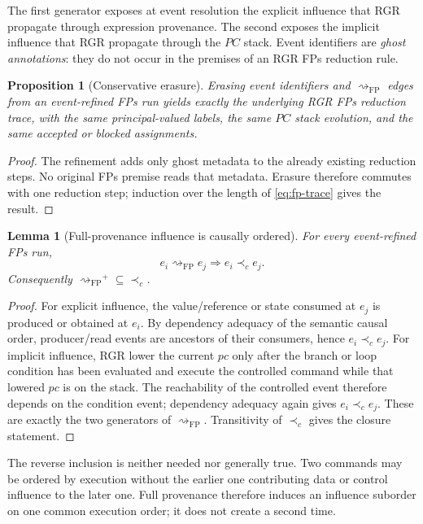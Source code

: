 \documentclass[10pt,twocolumn]{article}
\newcommand{\FP}{\mathrm{FP}}
\newcommand{\Influence}{\mathrel{\rightsquigarrow_{\!\FP}}}
\newcommand{\hb}{\prec_{c}}
\newtheorem{proposition}{Proposition}
\newtheorem{lemma}{Lemma}
\begin{document}
The first generator exposes at event resolution the explicit influence that
RGR propagate through expression provenance. The second exposes the implicit
influence that RGR propagate through the $PC$ stack. Event identifiers are
\emph{ghost annotations}: they do not occur in the premises of an RGR FPs
reduction rule.

\begin{proposition}[Conservative erasure]
Erasing event identifiers and $\Influence$ edges from an event-refined FPs run
yields exactly the underlying RGR FPs reduction trace, with the same
principal-valued labels, the same $PC$ stack evolution, and the same accepted
or blocked assignments.
\end{proposition}

\begin{proof}
The refinement adds only ghost metadata to the already existing reduction
steps. No original FPs premise reads that metadata. Erasure therefore commutes
with one reduction step; induction over the length of \eqref{eq:fp-trace} gives
the result.
\end{proof}

\begin{lemma}[Full-provenance influence is causally ordered]
\label{lem:fp-causal}
For every event-refined FPs run,
\begin{equation}
  e_i\Influence e_j\Longrightarrow e_i\hb e_j.
  \label{eq:fp-suborder}
\end{equation}
Consequently $\Influence^{+}\subseteq\hb$.
\end{lemma}

\begin{proof}
For explicit influence, the value/reference or state consumed at $e_j$ is
produced or obtained at $e_i$. By dependency adequacy of the semantic causal
order, producer/read events are ancestors of their consumers, hence
$e_i\hb e_j$. For implicit influence, RGR lower the current $pc$ only after
the branch or loop condition has been evaluated and execute the controlled
command while that lowered $pc$ is on the stack. The reachability of the
controlled event therefore depends on the condition event; dependency
adequacy again gives $e_i\hb e_j$. These are exactly the two generators of
$\Influence$. Transitivity of $\hb$ gives the closure statement.
\end{proof}

The reverse inclusion is neither needed nor generally true. Two commands may
be ordered by execution without the earlier one contributing data or control
influence to the later one. Full provenance therefore induces an influence
suborder on one common execution order; it does not create a second time.
\end{document}
